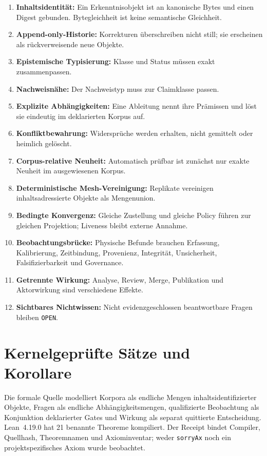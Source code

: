 \documentclass[11pt,a4paper,oneside]{article}
\newcommand{\code}[1]{\texttt{#1}}
\begin{document}
\begin{enumerate}[label=\textbf{A\arabic*.}]
  \item \textbf{Inhaltsidentität:} Ein Erkenntnisobjekt ist an kanonische Bytes
  und einen Digest gebunden. Bytegleichheit ist keine semantische Gleichheit.
  \item \textbf{Append-only-Historie:} Korrekturen überschreiben nicht still;
  sie erscheinen als rückverweisende neue Objekte.
  \item \textbf{Epistemische Typisierung:} Klasse und Status müssen exakt
  zusammenpassen.
  \item \textbf{Nachweisnähe:} Der Nachweistyp muss zur Claimklasse passen.
  \item \textbf{Explizite Abhängigkeiten:} Eine Ableitung nennt ihre Prämissen
  und löst sie eindeutig im deklarierten Korpus auf.
  \item \textbf{Konfliktbewahrung:} Widersprüche werden erhalten, nicht
  gemittelt oder heimlich gelöscht.
  \item \textbf{Corpus-relative Neuheit:} Automatisch prüfbar ist zunächst nur
  exakte Neuheit im ausgewiesenen Korpus.
  \item \textbf{Deterministische Mesh-Vereinigung:} Replikate vereinigen
  inhaltsadressierte Objekte als Mengenunion.
  \item \textbf{Bedingte Konvergenz:} Gleiche Zustellung und gleiche Policy
  führen zur gleichen Projektion; Liveness bleibt externe Annahme.
  \item \textbf{Beobachtungsbrücke:} Physische Befunde brauchen Erfassung,
  Kalibrierung, Zeitbindung, Provenienz, Integrität, Unsicherheit,
  Falsifizierbarkeit und Governance.
  \item \textbf{Getrennte Wirkung:} Analyse, Review, Merge, Publikation und
  Aktorwirkung sind verschiedene Effekte.
  \item \textbf{Sichtbares Nichtwissen:} Nicht evidenzgeschlossen
  beantwortbare Fragen bleiben \code{OPEN}.
\end{enumerate}

\section{Kernelgeprüfte Sätze und Korollare}

Die formale Quelle modelliert Korpora als endliche Mengen inhaltsidentifizierter
Objekte, Fragen als endliche Abhängigkeitsmengen, qualifizierte Beobachtung als
Konjunktion deklarierter Gates und Wirkung als separat quittierte Entscheidung.
Lean~4.19.0 hat 21 benannte Theoreme kompiliert. Der Receipt bindet Compiler,
Quellhash, Theoremnamen und Axiominventar; weder \code{sorryAx} noch ein
projektspezifisches Axiom wurde beobachtet.
\end{document}
